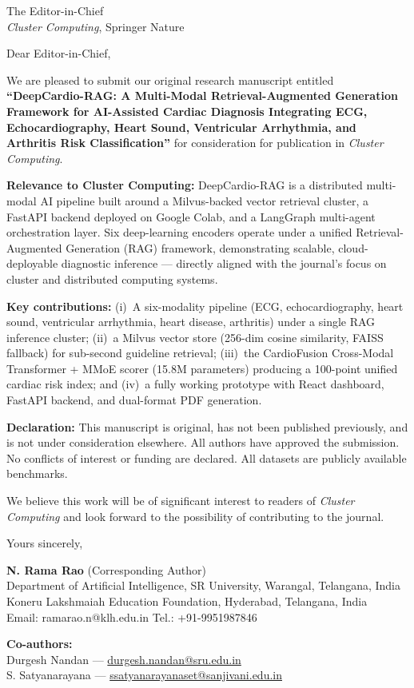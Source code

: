 \documentclass[a4paper,11pt]{letter}
\begin{document}
\begin{letter}{The Editor-in-Chief\\
\textit{Cluster Computing}, Springer Nature}

\opening{Dear Editor-in-Chief,}

We are pleased to submit our original research manuscript entitled \textbf{``DeepCardio-RAG: A Multi-Modal Retrieval-Augmented Generation Framework for AI-Assisted Cardiac Diagnosis Integrating ECG, Echocardiography, Heart Sound, Ventricular Arrhythmia, and Arthritis Risk Classification''} for consideration for publication in \textit{Cluster Computing}.

\textbf{Relevance to Cluster Computing:} DeepCardio-RAG is a distributed multi-modal AI pipeline built around a Milvus-backed vector retrieval cluster, a FastAPI backend deployed on Google Colab, and a LangGraph multi-agent orchestration layer. Six deep-learning encoders operate under a unified Retrieval-Augmented Generation (RAG) framework, demonstrating scalable, cloud-deployable diagnostic inference — directly aligned with the journal's focus on cluster and distributed computing systems.

\textbf{Key contributions:} (i)~A six-modality pipeline (ECG, echocardiography, heart sound, ventricular arrhythmia, heart disease, arthritis) under a single RAG inference cluster; (ii)~a Milvus vector store (256-dim cosine similarity, FAISS fallback) for sub-second guideline retrieval; (iii)~the CardioFusion Cross-Modal Transformer + MMoE scorer (15.8M parameters) producing a 100-point unified cardiac risk index; and (iv)~a fully working prototype with React dashboard, FastAPI backend, and dual-format PDF generation.

\textbf{Declaration:} This manuscript is original, has not been published previously, and is not under consideration elsewhere. All authors have approved the submission. No conflicts of interest or funding are declared. All datasets are publicly available benchmarks.

We believe this work will be of significant interest to readers of \textit{Cluster Computing} and look forward to the possibility of contributing to the journal.

\closing{Yours sincerely,}

\vspace{-0.3cm}
\textbf{N. Rama Rao} (Corresponding Author)\\
Department of Artificial Intelligence, SR University, Warangal, Telangana, India\\
Koneru Lakshmaiah Education Foundation, Hyderabad, Telangana, India\\
Email: ramarao.n@klh.edu.in \quad Tel.: +91-9951987846

\smallskip
\textbf{Co-authors:}\\
Durgesh Nandan --- \href{mailto:durgesh.nandan@sru.edu.in}{durgesh.nandan@sru.edu.in}\\
S. Satyanarayana --- \href{mailto:ssatyanarayanaset@sanjivani.edu.in}{ssatyanarayanaset@sanjivani.edu.in}

\end{letter}
\end{document}
